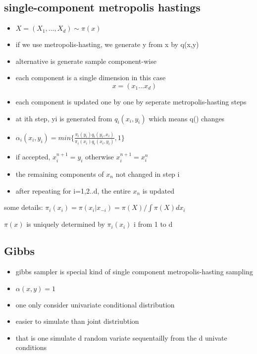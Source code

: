 \documentclass[10pt]{article}
\theoremstyle{break}
\begin{document}
    \subsection{single-component metropolis hastings}
        \begin{itemize}
            \item $X=(X_1 , ... , X_d)\sim \pi(x)$
            \item if we use metropolis-hasting, we generate y from x by q(x,y)
            \item alternative is generate sample component-wise 
            \item each component is a single dimension in this case $$x=(x_1 ... x_d)$$
            \item each component is updated one by one by seperate metropolis-hasting steps 
            \item at ith step, yi is generated from $q_i(x_i, y_i)$ which means q() changes
            \item $\alpha_i(x_i,y_i)=min\{\frac{\pi_i(y_i)q_i(y_i,x_i)}
            {\pi_i(x_i)q_i(x_i,y_i)},1\}$
            \item if accepted, $x_i^{n+1}=y_i$ otherwise $x_i^{n+1}=x_i^n$
            \item the remaining components of $x_n$ not changed in step i 
            \item after repeating for i=1,2..d, the entire $x_n$ is updated 
        \end{itemize}

        some details:
           $\pi_i(x_i)=\pi(x_i|x_{-i})=\pi(X)/\int \pi(X)dx_i$

           $\pi(x)$ is uniquely determined by $\pi_i(x_i)$ i from 1 to d 
        
    \subsection{Gibbs}
        \begin{itemize}
            \item gibbs sampler is special kind of single component metropolis-hasting sampling 
            \item $\alpha(x,y)=1$ 
            \item one only consider univariate conditional distribution 
            \item easier to simulate than joint distriubtion 
            \item that is one simulate d random variate sequentailly from the d univate conditions 
        \end{itemize}
\end{document}
